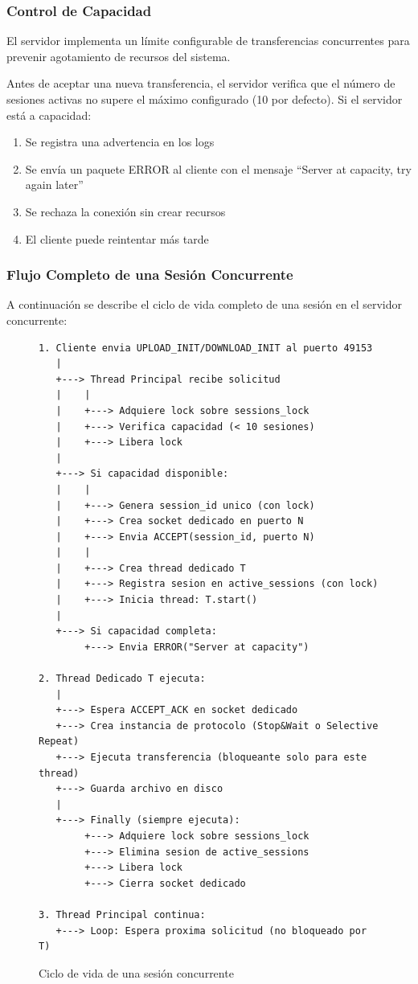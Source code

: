\subsubsection{Control de Capacidad}

El servidor implementa un límite configurable de transferencias concurrentes para prevenir agotamiento de recursos del sistema.

Antes de aceptar una nueva transferencia, el servidor verifica que el número de sesiones activas no supere el máximo configurado (10 por defecto). Si el servidor está a capacidad:

\begin{enumerate}
    \item Se registra una advertencia en los logs
    \item Se envía un paquete ERROR al cliente con el mensaje ``Server at capacity, try again later''
    \item Se rechaza la conexión sin crear recursos
    \item El cliente puede reintentar más tarde
\end{enumerate}

\subsubsection{Flujo Completo de una Sesión Concurrente}

A continuación se describe el ciclo de vida completo de una sesión en el servidor concurrente:

\begin{figure}[H]
\centering
\small
\begin{minipage}{0.9\textwidth}
\begin{verbatim}
1. Cliente envia UPLOAD_INIT/DOWNLOAD_INIT al puerto 49153
   |
   +---> Thread Principal recibe solicitud
   |    |
   |    +---> Adquiere lock sobre sessions_lock
   |    +---> Verifica capacidad (< 10 sesiones)
   |    +---> Libera lock
   |
   +---> Si capacidad disponible:
   |    |
   |    +---> Genera session_id unico (con lock)
   |    +---> Crea socket dedicado en puerto N
   |    +---> Envia ACCEPT(session_id, puerto N)
   |    |
   |    +---> Crea thread dedicado T
   |    +---> Registra sesion en active_sessions (con lock)
   |    +---> Inicia thread: T.start()
   |
   +---> Si capacidad completa:
        +---> Envia ERROR("Server at capacity")

2. Thread Dedicado T ejecuta:
   |
   +---> Espera ACCEPT_ACK en socket dedicado
   +---> Crea instancia de protocolo (Stop&Wait o Selective Repeat)
   +---> Ejecuta transferencia (bloqueante solo para este thread)
   +---> Guarda archivo en disco
   |
   +---> Finally (siempre ejecuta):
        +---> Adquiere lock sobre sessions_lock
        +---> Elimina sesion de active_sessions
        +---> Libera lock
        +---> Cierra socket dedicado

3. Thread Principal continua:
   +---> Loop: Espera proxima solicitud (no bloqueado por T)
\end{verbatim}
\end{minipage}
\caption{Ciclo de vida de una sesión concurrente}
\end{figure}




